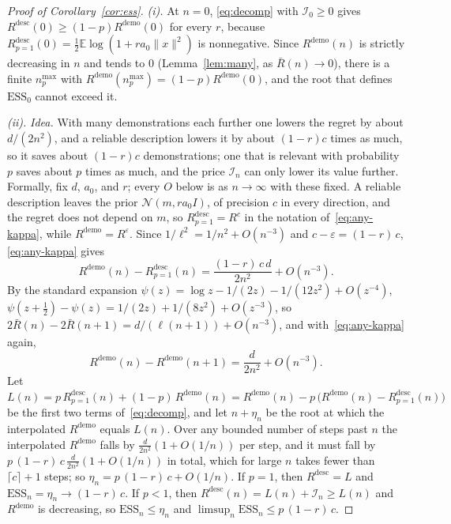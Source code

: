 \documentclass{article}
\newcommand{\ess}{\mathrm{ESS}}
\newcommand{\E}{\mathbb{E}}
\begin{document}
\begin{proof}[Proof of Corollary~\ref{cor:ess}]
\emph{(i).} At $n = 0$, \eqref{eq:decomp} with $\mathcal{I}_0 \ge 0$ gives $R^{\mathrm{desc}}(0) \ge (1-p)R^{\mathrm{demo}}(0)$ for every $r$, because $R^{\mathrm{desc}}_{p=1}(0) = \tfrac12 \E \log(1 + r a_0 \|x\|^2)$ is nonnegative. Since $R^{\mathrm{demo}}(n)$ is strictly decreasing in $n$ and tends to $0$ (Lemma~\ref{lem:many}, as $\bar R(n) \to 0$), there is a finite $n^{\max}_p$ with $R^{\mathrm{demo}}(n^{\max}_p) = (1-p)R^{\mathrm{demo}}(0)$, and the root that defines $\ess_0$ cannot exceed it.

\emph{(ii).} \emph{Idea.} With many demonstrations each further one lowers the regret by about $d/(2n^2)$, and a reliable description lowers it by about $(1-r)c$ times as much, so it saves about $(1-r)c$ demonstrations; one that is relevant with probability $p$ saves about $p$ times as much, and the price $\mathcal{I}_n$ can only lower its value further. Formally, fix $d$, $a_0$, and $r$; every $O$ below is as $n \to \infty$ with these fixed. A reliable description leaves the prior $\mathcal{N}(m, r a_0 I)$, of precision $c$ in every direction, and the regret does not depend on $m$, so $R^{\mathrm{desc}}_{p=1} = R^{c}$ in the notation of~\eqref{eq:any-kappa}, while $R^{\mathrm{demo}} = R^{\varepsilon}$. Since $1/\ell^2 = 1/n^2 + O(n^{-3})$ and $c - \varepsilon = (1-r)\,c$, \eqref{eq:any-kappa} gives
\[
R^{\mathrm{demo}}(n) - R^{\mathrm{desc}}_{p=1}(n) = \frac{(1-r)\,c\,d}{2n^2} + O(n^{-3}).
\]
By the standard expansion $\psi(z) = \log z - 1/(2z) - 1/(12z^2) + O(z^{-4})$, $\psi(z + \tfrac12) - \psi(z) = 1/(2z) + 1/(8z^2) + O(z^{-3})$, so $2\bar R(n) - 2\bar R(n+1) = d/(\ell(n+1)) + O(n^{-3})$, and with~\eqref{eq:any-kappa} again,
\[
R^{\mathrm{demo}}(n) - R^{\mathrm{demo}}(n+1) = \frac{d}{2n^2} + O(n^{-3}).
\]
Let $L(n) = p\,R^{\mathrm{desc}}_{p=1}(n) + (1-p)\,R^{\mathrm{demo}}(n) = R^{\mathrm{demo}}(n) - p\,\big(R^{\mathrm{demo}}(n) - R^{\mathrm{desc}}_{p=1}(n)\big)$ be the first two terms of~\eqref{eq:decomp}, and let $n + \eta_n$ be the root at which the interpolated $R^{\mathrm{demo}}$ equals $L(n)$. Over any bounded number of steps past $n$ the interpolated $R^{\mathrm{demo}}$ falls by $\tfrac{d}{2n^2}(1 + O(1/n))$ per step, and it must fall by $p\,(1-r)\,c\,\tfrac{d}{2n^2}(1 + O(1/n))$ in total, which for large $n$ takes fewer than $\lceil c \rceil + 1$ steps; so $\eta_n = p\,(1-r)\,c + O(1/n)$. If $p = 1$, then $R^{\mathrm{desc}} = L$ and $\ess_n = \eta_n \to (1-r)\,c$. If $p < 1$, then $R^{\mathrm{desc}}(n) = L(n) + \mathcal{I}_n \ge L(n)$ and $R^{\mathrm{demo}}$ is decreasing, so $\ess_n \le \eta_n$ and $\limsup_n \ess_n \le p\,(1-r)\,c$.
\end{proof}
\end{document}
